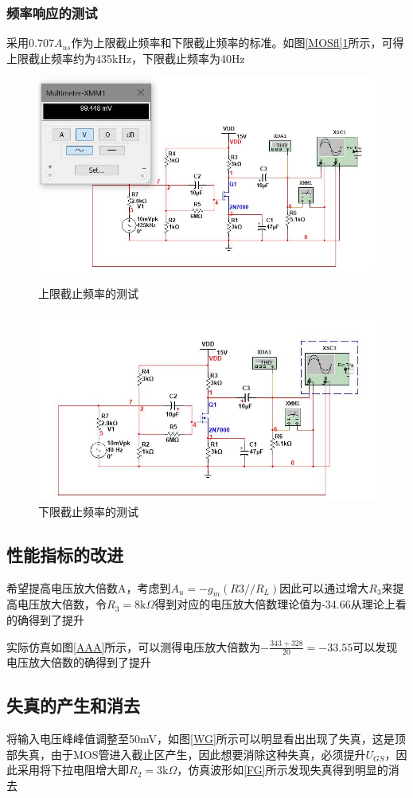 \documentclass[UTF8,a4paper]{ctexart}
\begin{document}
\subsubsection{频率响应的测试}
采用$0.707A_{us}$作为上限截止频率和下限截止频率的标准。如图\ref{MOSfl}\ref{MOSfh}所示，可得上限截止频率约为435kHz，下限截止频率为40Hz
\begin{figure}
\centering
\includegraphics[width=\textwidth]{2-4fh.jpg}
\caption{上限截止频率的测试}
\label{MOSfl}
\includegraphics[width=\textwidth]{2-4fl.jpg}
\caption{下限截止频率的测试}
\label{MOSfh}
\end{figure}
\subsection{性能指标的改进}
希望提高电压放大倍数A，考虑到$A_u=-g_m(R3//R_L)$因此可以通过增大$R_3$来提高电压放大倍数，令$R_3=8\mathrm{k}\Omega$得到对应的电压放大倍数理论值为-34.66从理论上看的确得到了提升

实际仿真如图\ref{AAA}所示，可以测得电压放大倍数为$-\frac{343+328}{20}=-33.55$可以发现电压放大倍数的确得到了提升
\subsection{失真的产生和消去}
将输入电压峰峰值调整至50mV，如图\ref{WG}所示可以明显看出出现了失真，这是顶部失真，由于MOS管进入截止区产生，因此想要消除这种失真，必须提升$U_{GS}$，因此采用将下拉电阻增大即$R_2=3\mathrm{k}\Omega$，仿真波形如\ref{FG}所示发现失真得到明显的消去
\end{document}
